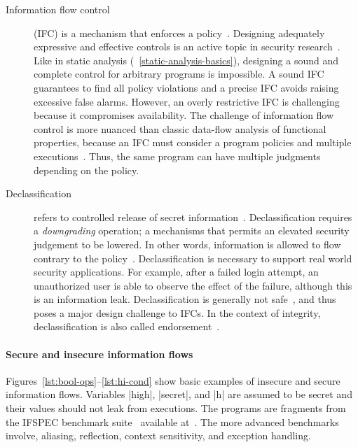\begin{description}
\item[Information flow control] (IFC)
is a mechanism that enforces a {policy}~\cite{bishop2003}.
Designing adequately expressive and effective controls is an active topic in security research~\cite{vandermeyden2007,bossi2005,sabelfeld2003}.
Like in static analysis (\cf~\autoref{static-analysis-basics}), designing a sound and complete control for arbitrary programs is impossible.
A sound IFC guarantees to find all policy violations and a precise IFC avoids raising excessive false alarms.
However, an overly restrictive IFC is challenging because it compromises availability.
The challenge of information flow control is more nuanced than classic data-flow analysis of functional properties,
because an IFC must consider a program \wrt policies and multiple executions~\cite{frumin2021}.
Thus, the same program can have multiple judgments depending on the policy.

\item[Declassification]
refers to controlled release of secret information~\cite{sabelfeld2009}.
Declassification requires a \emph{downgrading} operation;
a mechanisms that permits an elevated security judgement to be lowered.
In other words, information is allowed to flow contrary to the {policy}~\cite{cecchetti2017}.
Declassification is necessary to support real world security applications.
For example, after a failed login attempt, an unauthorized user is able to observe the effect of the failure, 
although this is an information leak.
Declassification is generally not safe~\cite{derakhshan2024}, 
and thus poses a major design challenge to IFCs.
In the context of integrity, declassification is also called {endorsement}~\cite{marion2011}.

\end{description}

\paragraph*{Secure and insecure information flows}
Figures~\ref{lst:bool-ops}--\ref{lst:hi-cond} show basic examples of insecure and secure information flows.
Variables \pr|high|, \pr|secret|, and \pr|h| are assumed to be secret and their values should not leak from executions.
The programs are fragments from the {IFSPEC benchmark suite}~\cite{hamann2018} available at~\cite{ifspec}.
The more advanced benchmarks involve, \eg aliasing, reflection, context sensitivity, and exception handling.

